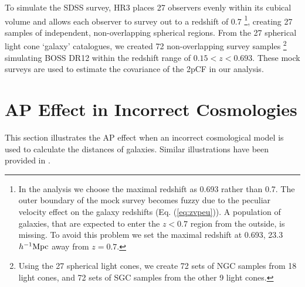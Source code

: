 \documentclass[iop]{emulateapj}
\begin{document}

To simulate the SDSS survey,
HR3 places 27 observers evenly within its cubical volume and allows
each observer to survey out to a redshift of 0.7
\footnote{In the analysis we choose the maximal redshift as 0.693 rather than 0.7. 
The outer boundary of the mock survey becomes fuzzy due to the peculiar velocity effect 
on the galaxy redshifts (Eq. (\ref{eq:zvpeu})).
A population of galaxies, that are expected to enter the $z<0.7$ region from the outside, is missing.
To avoid this problem we set the maximal redshift at 0.693, 
23.3 $h^{-1}{\rm Mpc}$ away from $z=0.7$.}, 
creating 27 samples of independent, non-overlapping spherical regions.
From the 27 spherical light cone `galaxy' catalogues, 
we created 72 non-overlapping survey samples 
\footnote{Using the 27 spherical light cones, we create 72 sets of NGC samples from 18 light cones, 
and 72 sets of SGC samples from the other 9 light cones.}
simulating BOSS DR12 within the redshift range of $0.15< z< 0.693$.
These mock surveys are used to estimate the covariance of the 2pCF in our analysis.



\section{AP Effect in Incorrect Cosmologies}
\label{sec:APeffect}

This section illustrates the AP effect when an incorrect cosmological model is used to calculate the distances of galaxies. Similar illustrations have been provided in \cite{Li2014,Li2015}.
\end{document}
